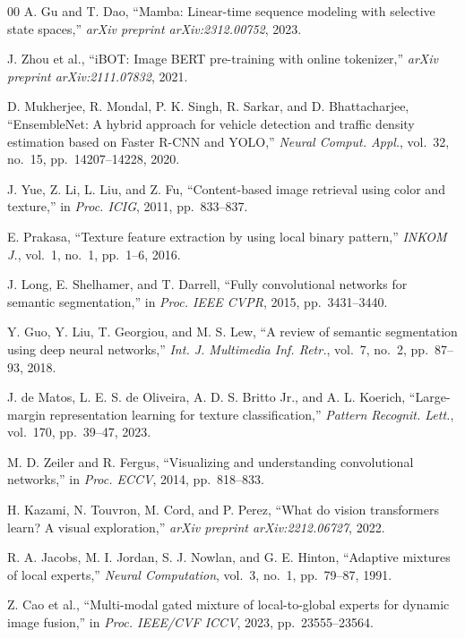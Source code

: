 \documentclass[conference]{IEEEtran}
\begin{document}
\begin{thebibliography}{00}
A. Gu and T. Dao, ``Mamba: Linear-time sequence modeling with selective
state spaces,'' \emph{arXiv preprint arXiv:2312.00752}, 2023.

J. Zhou et al., ``iBOT: Image BERT pre-training with online tokenizer,''
\emph{arXiv preprint arXiv:2111.07832}, 2021.

D. Mukherjee, R. Mondal, P. K. Singh, R. Sarkar, and D. Bhattacharjee,
``EnsembleNet: A hybrid approach for vehicle detection and traffic density
estimation based on Faster R-CNN and YOLO,'' \emph{Neural Comput. Appl.},
vol.~32, no.~15, pp.~14207--14228, 2020.

J. Yue, Z. Li, L. Liu, and Z. Fu, ``Content-based image retrieval using
color and texture,'' in \emph{Proc. ICIG}, 2011, pp.~833--837.

E. Prakasa, ``Texture feature extraction by using local binary pattern,''
\emph{INKOM J.}, vol.~1, no.~1, pp.~1--6, 2016.

J. Long, E. Shelhamer, and T. Darrell, ``Fully convolutional networks for
semantic segmentation,'' in \emph{Proc. IEEE CVPR}, 2015, pp.~3431--3440.

Y. Guo, Y. Liu, T. Georgiou, and M. S. Lew, ``A review of semantic
segmentation using deep neural networks,'' \emph{Int. J. Multimedia Inf.
Retr.}, vol.~7, no.~2, pp.~87--93, 2018.

J. de Matos, L. E. S. de Oliveira, A. D. S. Britto Jr., and
A. L. Koerich, ``Large-margin representation learning for texture
classification,'' \emph{Pattern Recognit. Lett.}, vol.~170, pp.~39--47,
2023.

M. D. Zeiler and R. Fergus, ``Visualizing and understanding convolutional
networks,'' in \emph{Proc. ECCV}, 2014, pp.~818--833.

H. Kazami, N. Touvron, M. Cord, and P. Perez, ``What do vision
transformers learn? A visual exploration,''
\emph{arXiv preprint arXiv:2212.06727}, 2022.

R. A. Jacobs, M. I. Jordan, S. J. Nowlan, and G. E. Hinton,
``Adaptive mixtures of local experts,''
\emph{Neural Computation}, vol.~3, no.~1, pp.~79--87, 1991.

Z. Cao et al., ``Multi-modal gated mixture of local-to-global experts for
dynamic image fusion,'' in \emph{Proc. IEEE/CVF ICCV}, 2023,
pp.~23555--23564.

\end{thebibliography}
\end{document}

